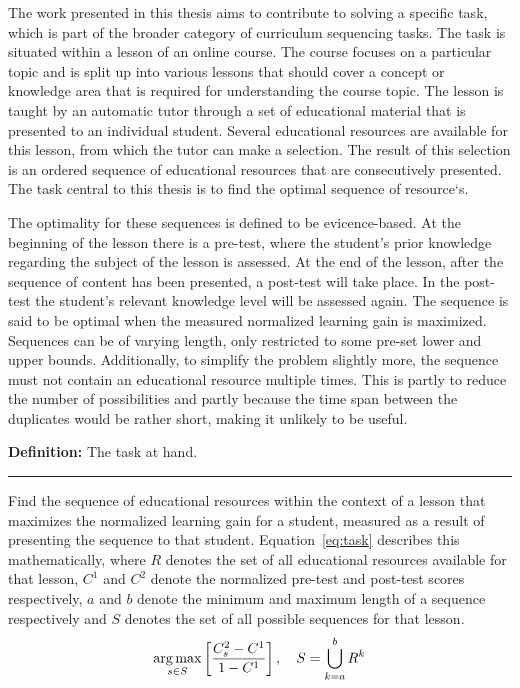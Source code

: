 \label{ch_problem_domain}
The work presented in this thesis aims to contribute to solving a specific
task, which is part of the broader category of curriculum sequencing tasks.
The task is situated within a lesson of an online course. The course
focuses on a particular topic and is split up into various lessons that should
cover a concept or knowledge area that is required for understanding the
course topic. The lesson is taught by an automatic tutor through a set of
educational material that is presented to an individual student. Several
educational resources are available for this lesson, from which the tutor can
make a selection. The result of this selection is an ordered sequence of
educational resources that are consecutively presented. The task central
to this thesis is to find the optimal sequence of resource`s.

The optimality for these sequences is defined to be evicence-based. At the
beginning of the lesson there is a pre-test, where the student's prior knowledge
regarding the subject of the lesson is assessed. At the end of the lesson,
after the sequence of content has been presented, a post-test will take place.
In the post-test the student's relevant knowledge level will be assessed again.
The sequence is said to be optimal when the measured normalized learning gain
is maximized. Sequences can be of varying length, only restricted to some pre-set
lower and upper bounds. Additionally, to simplify the problem slightly more,
the sequence must not contain an educational resource multiple times. This is
partly to reduce the number of possibilities and partly because the time span
between the duplicates would be rather short, making it unlikely to be useful.

\begin{framed}\noindent
\textbf{{\large Definition:}} The task at hand. \vspace{0.5\onelineskip} \hrule
\vspace{\baselineskip}\noindent
Find the sequence of educational resources within the context of a lesson that
maximizes the normalized learning gain for a student, measured as a
result of presenting the sequence to that student.
Equation~\eqref{eq:task} describes this mathematically, where $R$ denotes the
set of all educational resources available for that lesson, $C^1$ and $C^2$
denote the normalized pre-test and post-test scores respectively, $a$ and $b$
denote the minimum and maximum length of a sequence respectively and $S$
denotes the set of all possible sequences for that lesson.\noindent
\begin{equation}
	\label{eq:task}
	\operatorname*{arg\,max}_{s \in S} \left[ \frac{C^2_s-C^1}{1-C^1} \right],
	\quad S = \bigcup_{k = a}^{b} R^k
\end{equation}
\end{framed}

